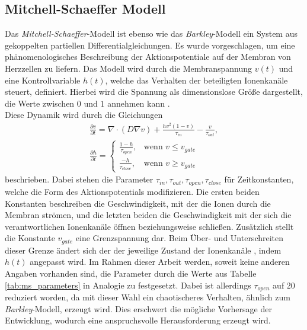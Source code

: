\subsection{Mitchell-Schaeffer Modell}
Das \textit{Mitchell-Schaeffer}-Modell ist ebenso wie das \textit{Barkley}-Modell ein System aus gekoppelten partiellen Differentialgleichungen. Es wurde vorgeschlagen, um eine phänomenologisches Beschreibung der Aktionspotentiale auf der Membran von Herzzellen zu liefern. Das Modell wird durch die Membranspannung $v(t)$ und eine Kontrollvariable $h(t)$, welche das Verhalten der beteiligten Ionenkanäle steuert, definiert. Hierbei wird die Spannung als dimensionslose Größe dargestellt, die Werte zwischen $0$ und $1$ annehmen kann \citep{mitchell2003two}.\\

Diese Dynamik wird durch die Gleichungen 
\begin{equation}
\begin{gathered}
\frac{\partial v}{\partial t} = \nabla \cdot (D \nabla v) + \frac{h v^2(1-v)}{\tau_{in}} - \frac{v}{\tau_{out}},\\
\frac{\partial h}{\partial t} =
\begin{cases}
	\frac{1-h}{\tau_{open}},& \text{wenn } v \leq v_{gate}\\
    \frac{-h}{\tau_{close}},& \text{wenn } v \geq v_{gate}
\end{cases}
\end{gathered}
\end{equation}
beschrieben. Dabei stehen die Parameter $\tau_{in}, \tau_{out}, \tau_{open}, \tau_{close}$ für Zeitkonstanten, welche die Form des Aktionspotentials modifizieren. Die ersten beiden Konstanten beschreiben die Geschwindigkeit, mit der die Ionen durch die Membran strömen, und die letzten beiden die Geschwindigkeit mit der sich die verantwortlichen Ionenkanäle öffnen beziehungsweise schließen. Zusätzlich stellt die Konstante $v_{gate}$ eine Grenzspannung dar. Beim Über- und Unterschreiten dieser Grenze ändert sich der der jeweilige Zustand der Ionenkanäle , indem $h(t)$ angepasst wird. Im Rahmen dieser Arbeit werden, soweit keine anderen Angaben vorhanden sind, die Parameter durch die Werte aus Tabelle \ref{tab:ms_parameters} in Analogie zu \citep{mitchell2003two} festgesetzt. Dabei ist allerdings $\tau_{open}$ auf $20$ \citep[S. 134ff.]{bartocci2016computational} reduziert worden, da mit dieser Wahl ein chaotischeres Verhalten, ähnlich zum \textit{Barkley}-Modell, erzeugt wird. Dies erschwert die mögliche Vorhersage der Entwicklung, wodurch eine anspruchsvolle Herausforderung erzeugt wird.\\

